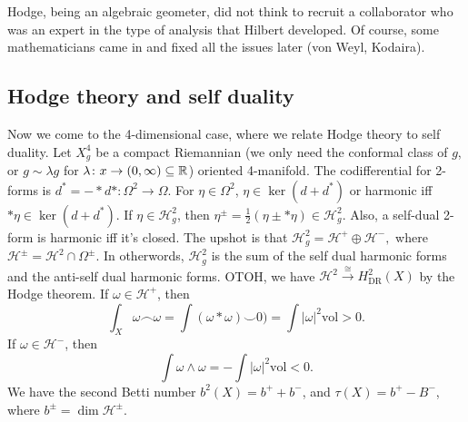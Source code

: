 Hodge, being an algebraic geometer, did not think to recruit a collaborator who was an expert in the type of analysis that Hilbert developed. Of course, some mathematicians came in and fixed all the issues later (von Weyl, Kodaira).

\subsection{Hodge theory and self duality}
Now we come to the 4-dimensional case, where we relate Hodge theory to self duality. Let $X^4_g$ be a compact Riemannian (we only need the conformal class of $g$, or $g \sim \lambda g$ for $\lambda \colon x \to (0, \infty) \subseteq \mathbb{R}$) oriented 4-manifold. The codifferential for 2-forms is $d^* = -*d* \colon  \Omega^2 \to \Omega$. For $\eta \in \Omega^2$, $\eta \in \ker (d + d^*)$ or harmonic iff $*\eta \in \ker(d+d^*)$. If $\eta \in \mathcal H^2 _g$, then $\eta ^{\pm}= \frac{1}{2}(\eta \pm *\eta)\in \mathcal H^2_g$. Also, a self-dual 2-form is harmonic iff it's closed. The upshot is that $\mathcal H^2 _g = \mathcal H^+ \oplus \mathcal H^-,$ where $\mathcal H ^{\pm}= \mathcal H^2 \cap \Omega^{\pm}$. In otherwords, $\mathcal H^2_g$ is the sum of the self dual harmonic forms and the anti-self dual harmonic forms. OTOH, we have $\mathcal H^2 \xrightarrow{\cong } H _{\mathrm{DR}}^2 (X)$ by the Hodge theorem.
If $\omega \in \mathcal H^+$, then \[
    \int_X \omega \frown \omega = \int (\omega * \omega) \smile 0) = \int |\omega|^2 \mathrm{vol} >0.
\] If $\omega \in \mathcal H^-$, then \[
\int \omega \wedge \omega = -\int |\omega|^2 \mathrm{vol}<0.
\] We have the second Betti number $b^2(X)= b^+ + b^-$, and $\tau(X) = b^+ - B^-$, where $b^{\pm}=\dim \mathcal H^{\pm}$.

